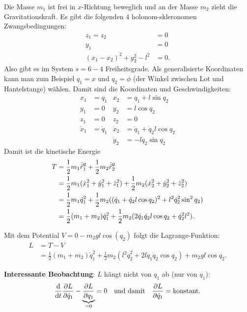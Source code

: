 \begin{beispiel*}
	Die Masse $m_1$ ist frei in $x$-Richtung beweglich und an der Masse $m_2$ zieht die Gravitationskraft.
	Es gibt die folgenden 4 holonom-skleronomen Zwangsbedingungen:
	\begin{align*}
	z_1 = z_2 &= 0\\
	y_1 &= 0\\
	(x_1 - x_2)^2 + y_2^2 - l^2 &= 0
	\text{.}
	\end{align*}
	Also gibt es im System $s = 6 - 4$ Freiheitsgrade.
	Als generalisierte Koordinaten kann man zum Beispiel $q_1 = x$ und $q_2 = \phi$ (der Winkel zwischen Lot und Hantelstange) wählen. Damit sind die Koordinaten und Geschwindigkeiten:
	\begin{align*}
	x_1 &= q_1 & x_2 &= q_1 + l \sin q_2\\
	y_1 &= 0 & y_2 &= l \cos q_2\\
	z_1 &= 0 & z_2 &= 0\\
	\dot{x}_1 &= \dot{q}_1 & \dot{x}_2 &= \dot{q}_1 + \dot{q}_2 l \cos q_2\\
	&&\dot{y}_2 &= - l \dot{q}_2 \sin q_2
	\end{align*}
	Damit ist die kinetische Energie
	\begin{align*}
	T & = \frac12 m_1 \dot{\vec{r}}^2_1 + \frac12 m_2 \dot{\vec{r}}^2_2 \\
	&= \frac12 m_1 (\dot{x}_1^2 + \dot{y}_1^2 + \dot{z}_1^2) + \frac12 m_2 (\dot{x}_2^2 + \dot{y}_2^2 + \dot{z}_2^2) \\
	&= \frac12 m_1 \dot{q}_1^2 + \frac12 m_2 ( (\dot{q}_1 + \dot{q}_2 l \cos q_2)^2 + l^2 \dot{q}_2^2 \sin^2 q_2) \\
	&= \frac12 (m_1 + m_2) \dot{q}_1^2 + \frac12 m_2 (2 \dot{q}_1 \dot{q}_2 l \cos q_2 + \dot{q}_2^2 l^2) 
	\text{.}
	\end{align*}
	
	Mit dem Potential $V = 0 - m_2 g l \cos(q_2)$ folgt die Lagrange-Funktion:
	\begin{align*}
		L &= T - V \\
		&= \frac12 (m_1 + m_2) \dot{q}_1^2 + \frac12 m_2 (l^2 \dot{q}_2^2 + 2 l \dot{q}_1 \dot{q}_2 \cos q_2) + m_2 g l \cos q_2
		\text{.}
	\end{align*}
	
	\textbf{Interessante Beobachtung}: $L$ hängt nicht von $q_1$ ab (nur von $\dot{q}_1$):
	\[
		\frac{\mathrm d}{\mathrm d t} \frac{\partial L}{\partial \dot{q}_1} - \underbrace{\frac{\partial L}{\partial q_1}}_{= 0} = 0
		\quad \text{und damit} \quad 	
		\frac{\partial L}{\partial \dot{q}_1} = \text{konstant}
		\text{.}
	\]
\end{beispiel*}

